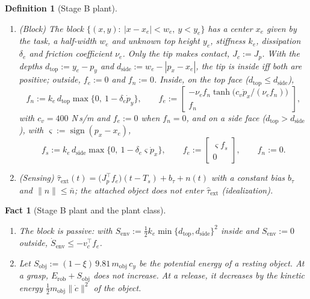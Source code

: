 \documentclass[11pt]{article}\usepackage[margin=1in]{geometry}\usepackage{amsmath,amssymb,amsthm,mathtools}\usepackage{graphicx}\graphicspath{{figures/}{../figures/}{figs/}{./}}\usepackage{enumitem}\usepackage{hyperref}\usepackage{cleveref}\usepackage{tikz}\usetikzlibrary{arrows.meta,positioning,calc,shapes.geometric}\usepackage{float}\usepackage{rotating}\usepackage[most]{tcolorbox}\usepackage{kotex}\usepackage{booktabs}\usepackage{longtable}\emergencystretch=1.6em\tolerance=2000 \crefname{assumption}{Assumption}{Assumptions}\Crefname{assumption}{Assumption}{Assumptions}\crefname{definition}{Definition}{Definitions}\Crefname{definition}{Definition}{Definitions}\crefname{proposition}{Proposition}{Propositions}\Crefname{proposition}{Proposition}{Propositions}\crefname{fact}{Fact}{Facts}\Crefname{fact}{Fact}{Facts} \newtheorem{assumption}{Assumption}\newtheorem{definition}{Definition}\newtheorem{lemma}{Lemma}\newtheorem{proposition}{Proposition}\newtheorem{theorem}{Theorem}\newtheorem{corollary}{Corollary}\newtheorem{fact}{Fact}\theoremstyle{remark}\newtheorem{remark}{Remark} \newcommand{\R}{\mathbb{R}}\newcommand{\xb}{\bar x}\newcommand{\Ab}{\bar A}\newcommand{\By}{\bar B_y}\newcommand{\U}{\mathcal U}\newcommand{\Z}{\mathcal Z}
\begin{document}
\begin{definition}[Stage B plant]
\begin{enumerate}[label=(\alph*)]
\[
\dot q(t_k^+):=M_+(q)^{-1}M_-(q)\,\dot q(t_k^-) ;
\]
a release leaves $\dot q$ unchanged, and the released object rests at its current pose and can be grasped again.
\item (Block) The block $\{(x,y):\ |x-x_e|<w_e,\ y<y_e\}$ has a center $x_e$ given by the task, a half-width $w_e$ and unknown top height $y_e$, stiffness $k_e$, dissipation $\delta_e$ and friction coefficient $\nu_e$. Only the tip makes contact, $J_c:=J_p$. With the depths $d_{\mathrm{top}}:=y_e-p_y$ and $d_{\mathrm{side}}:=w_e-|p_x-x_e|$, the tip is inside iff both are positive; outside, $f_e:=0$ and $f_n:=0$. Inside, on the top face ($d_{\mathrm{top}}\le d_{\mathrm{side}}$),
\[
f_n:=k_e\,d_{\mathrm{top}}\max\{0,\ 1-\delta_e\dot p_y\},\qquad f_e:=\begin{bmatrix}-\nu_ef_n\tanh\big(c_v\dot p_x/(\nu_ef_n)\big)\\ f_n\end{bmatrix},
\]
with $c_v=400$ N\,s/m and $f_e:=0$ when $f_n=0$, and on a side face ($d_{\mathrm{top}}>d_{\mathrm{side}}$), with $\varsigma:=\operatorname{sign}(p_x-x_e)$,
\[
f_s:=k_e\,d_{\mathrm{side}}\max\{0,\ 1-\delta_e\varsigma\dot p_x\},\qquad f_e:=\begin{bmatrix}\varsigma f_s\\ 0\end{bmatrix},\qquad f_n:=0 .
\]
\item (Sensing) $\hat\tau_{\mathrm{ext}}(t)=\big(J_p^\top f_e\big)(t-T_s)+b_\tau+n(t)$ with a constant bias $b_\tau$ and $\|n\|\le\bar n$; the attached object does not enter $\hat\tau_{\mathrm{ext}}$ (idealization).
\end{enumerate}
\end{definition}

\begin{fact}[Stage B plant and the plant class]
\label{fact:stageBclass}
\begin{enumerate}[label=(\alph*)]
\item The block is passive: with $S_{\mathrm{env}}:=\tfrac12k_e\min\{d_{\mathrm{top}},d_{\mathrm{side}}\}^2$ inside and $S_{\mathrm{env}}:=0$ outside, $\dot S_{\mathrm{env}}\le-v_c^\top f_e$.
\item Let $S_{\mathrm{obj}}:=(1-\xi)\,9.81\,m_{\mathrm{obj}}\,c_y$ be the potential energy of a resting object. At a grasp, $E_{\mathrm{rob}}+S_{\mathrm{obj}}$ does not increase. At a release, it decreases by the kinetic energy $\tfrac12m_{\mathrm{obj}}\|\dot c\|^2$ of the object.
\end{enumerate}
\end{fact}
\end{document}
